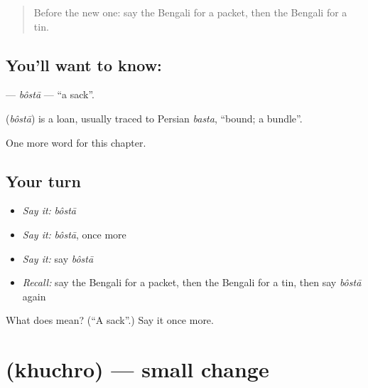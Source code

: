 \label{lesson:BN-C233-bosta}



\begin{quote}
Before the new one: say the Bengali for a packet, then the Bengali for a tin.
\end{quote}

\subsection*{You'll want to know: }
\textbf{} — \emph{bôstā} — \textquotedblleft{}a sack\textquotedblright{}.

\begin{cousinweb}
\textbf{} (\emph{bôstā}) is a loan, usually traced to Persian \emph{basta}, \textquotedblleft{}bound; a bundle\textquotedblright{}.
\end{cousinweb}

\begin{grammarlens}[title={What you've built}]
One more word for this chapter.
\end{grammarlens}

\subsection*{Your turn}
\begin{itemize}
\raggedright
  \item \emph{Say it:} \emph{bôstā}
  \item \emph{Say it:} \emph{bôstā}, once more
  \item \emph{Say it:} say \emph{bôstā}
  \item \emph{Recall:} say the Bengali for a packet, then the Bengali for a tin, then say \emph{bôstā} again
\end{itemize}

\begin{tcolorbox}[breakable,colback=teal!4,colframe=teal!35!black,title={Before you move on}]
What does  mean? (\textquotedblleft{}A sack\textquotedblright{}.) Say it once more.
\end{tcolorbox}
\section[\texorpdfstring{\bn{খুচরো} (khuchro)}{খুচরো (khuchro)}]{ (khuchro) — small change}

\label{lesson:BN-C233-khuchro}



